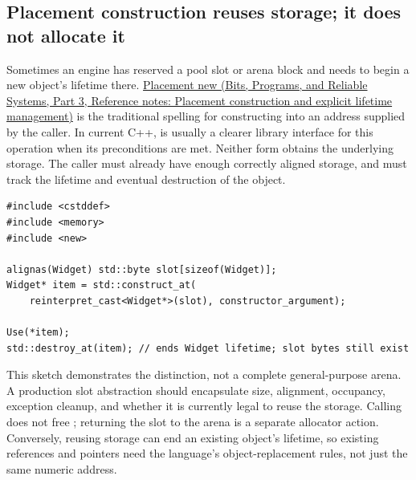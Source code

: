\subsection{Placement construction reuses storage; it does not allocate it}\label{05-engine-i-ch004-placement-construction-reuses-storage-it-does-not-allocate-it}

\hypertarget{05-engine-i-ch004-placement-construction-reuses-storage-it-does-not-allocate-it}{}

Sometimes an engine has reserved a pool slot or arena block and needs to begin a new object's lifetime there. \href{../01-Bits-Programs-and-Reliable-Systems-P03/main.pdf\#nameddest=appendix-f56c3e43fd4e}{Placement new (Bits, Programs, and Reliable Systems, Part 3, Reference notes: Placement construction and explicit lifetime management)} is the traditional spelling for constructing into an address supplied by the caller. In current C++,  is usually a clearer library interface for this operation when its preconditions are met. Neither form obtains the underlying storage. The caller must already have enough correctly aligned storage, and must track the lifetime and eventual destruction of the object.

\begin{verbatim}
#include <cstddef>
#include <memory>
#include <new>

alignas(Widget) std::byte slot[sizeof(Widget)];
Widget* item = std::construct_at(
    reinterpret_cast<Widget*>(slot), constructor_argument);

Use(*item);
std::destroy_at(item); // ends Widget lifetime; slot bytes still exist
\end{verbatim}

This sketch demonstrates the distinction, not a complete general-purpose arena. A production slot abstraction should encapsulate size, alignment, occupancy, exception cleanup, and whether it is currently legal to reuse the storage. Calling  does not free ; returning the slot to the arena is a separate allocator action. Conversely, reusing storage can end an existing object's lifetime, so existing references and pointers need the language's object-replacement rules, not just the same numeric address.


